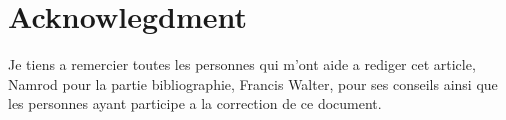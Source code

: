 \chapter*{Acknowlegdment}
Je tiens a remercier toutes les personnes qui m'ont aide a rediger cet article, Namrod pour la
partie bibliographie, Francis Walter, pour ses conseils ainsi que les personnes ayant participe a
la correction de ce document.
